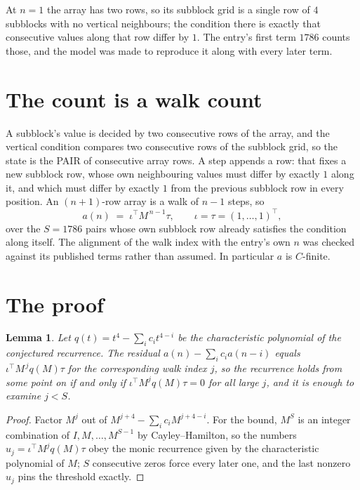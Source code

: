 \documentclass[11pt,a4paper]{article}
\theoremstyle{plain}
\newtheorem{lemma}[theorem]{Lemma}
\theoremstyle{definition}
\begin{document}
At $n=1$ the array has two rows, so its subblock grid is a single row of $4$ subblocks with
no vertical neighbours; the condition there is exactly that consecutive values along that row
differ by $1$. The entry's first term $1786$ counts those, and the model was made to
reproduce it along with every later term.

\section{The count is a walk count}

A subblock's value is decided by two consecutive rows of the array, and the
vertical condition compares two consecutive rows of the subblock grid, so the state is the
PAIR of consecutive array rows. A step appends a row: that fixes a new subblock row, whose own
neighbouring values must differ by exactly $1$ along it, and which must differ by exactly
$1$ from the previous subblock row in every position. An $(n+1)$-row array is a walk of
$n-1$ steps, so
\[
a(n)\;=\;\iota^{\!\top}M^{\,n-1}\tau,\qquad\iota=\tau=(1,\dots,1)^{\!\top},
\]
over the $S=1786$ pairs whose own subblock row already satisfies the condition along itself.
The alignment of the walk index with the entry's own $n$ was checked against its published
terms rather than assumed. In particular $a$ is $C$-finite.

\section{The proof}

\begin{lemma}\label{lem:crit}
Let $q(t)=t^{4}-\sum_i c_it^{4-i}$ be the characteristic polynomial of the
conjectured recurrence. The residual $a(n)-\sum_ic_ia(n-i)$ equals
$\iota^{\!\top}M^{\,j}q(M)\tau$ for the corresponding walk index $j$, so the recurrence
holds from some point on if and only if $\iota^{\!\top}M^{j}q(M)\tau=0$ for all large $j$,
and it is enough to examine $j<S$.
\end{lemma}

\begin{proof}
Factor $M^{j}$ out of $M^{j+4}-\sum_ic_iM^{j+4-i}$. For the bound, $M^{S}$
is an integer combination of $I,M,\dots,M^{S-1}$ by Cayley--Hamilton, so the numbers
$u_j=\iota^{\!\top}M^{j}q(M)\tau$ obey the monic recurrence given by the characteristic
polynomial of $M$; $S$ consecutive zeros force every later one, and the last nonzero $u_j$
pins the threshold exactly.
\end{proof}
\end{document}
